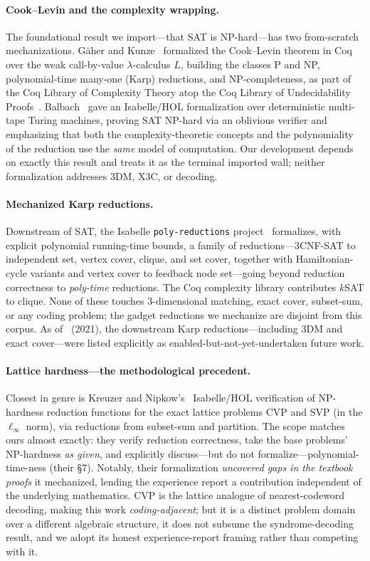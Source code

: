 \documentclass[a4paper,UKenglish,cleveref,autoref]{lipics-v2021}
\begin{document}
\paragraph*{Cook--Levin and the complexity wrapping.} The foundational result we import---that SAT is
NP-hard---has two from-scratch mechanizations. Gäher and Kunze~\cite{GK21} formalized the Cook--Levin theorem in
Coq over the weak call-by-value $\lambda$-calculus $L$, building the classes P and NP, polynomial-time many-one
(Karp) reductions, and NP-completeness, as part of the Coq Library of Complexity Theory atop the Coq Library of
Undecidability Proofs~\cite{CLUP}. Balbach~\cite{Bal23} gave an Isabelle/HOL formalization over deterministic
multi-tape Turing machines, proving SAT NP-hard via an oblivious verifier and emphasizing that both the
complexity-theoretic concepts and the polynomiality of the reduction use the \emph{same} model of computation.
Our development depends on exactly this result and treats it as the terminal imported wall; neither
formalization addresses 3DM, X3C, or decoding.

\paragraph*{Mechanized Karp reductions.} Downstream of SAT, the Isabelle \lstinline{poly-reductions}
project~\cite{PolyRed} formalizes, with explicit polynomial running-time bounds, a family of
reductions---3CNF-SAT to independent set, vertex cover, clique, and set cover, together with
Hamiltonian-cycle variants and vertex cover to feedback node set---going beyond reduction correctness to
\emph{poly-time} reductions. The Coq
complexity library contributes $k$SAT to clique. None of these touches 3-dimensional matching, exact cover,
subset-sum, or any coding problem; the gadget reductions we mechanize are disjoint from this corpus. As
of~\cite{GK21} (2021), the downstream Karp reductions---including 3DM and exact cover---were listed explicitly
as enabled-but-not-yet-undertaken future work.

\paragraph*{Lattice hardness---the methodological precedent.} Closest in genre is Kreuzer and
Nipkow's~\cite{KN23} Isabelle/HOL verification of NP-hardness reduction functions for the exact lattice problems
CVP and SVP (in the $\ell_\infty$ norm), via reductions from subset-sum and partition. The scope matches ours
almost exactly: they verify reduction correctness, take the base problems' NP-hardness \emph{as given}, and
explicitly discuss---but do not formalize---polynomial-time-ness (their \S7). Notably, their formalization
\emph{uncovered gaps in the textbook proofs} it mechanized, lending the experience report a contribution
independent of the underlying mathematics. CVP is the lattice analogue of nearest-codeword decoding, making
this work \emph{coding-adjacent}; but it is a distinct problem domain over a different algebraic structure, it
does not subsume the syndrome-decoding result, and we adopt its honest experience-report framing rather than
competing with it.
\end{document}
